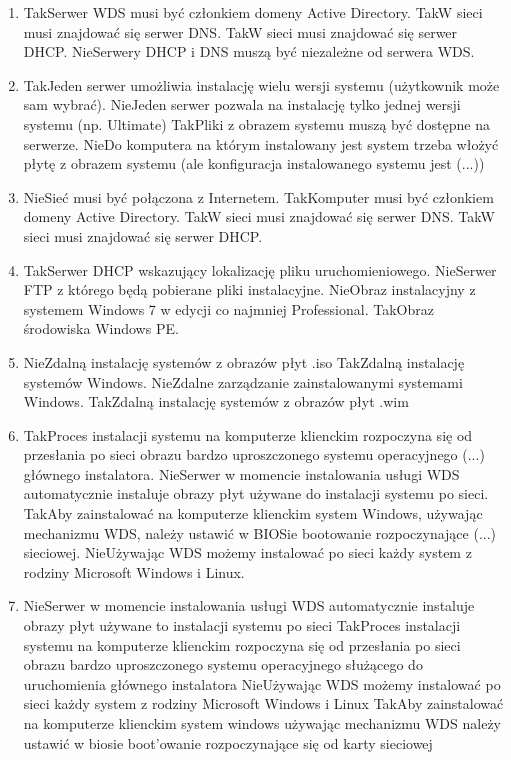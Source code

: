 \begin{enumerate}
		{Tak}{Kontroler domeny, serwer DNS, serwer DHCP}
		\item {}%
		{Tak}{Serwer WDS musi być członkiem domeny Active Directory.}%
		{Tak}{W sieci musi znajdować się serwer DNS.}%
		{Tak}{W sieci musi znajdować się serwer DHCP.}%
		{Nie}{Serwery DHCP i DNS muszą być niezależne od serwera WDS.}
		\item {}%
		{Tak}{Jeden serwer umożliwia instalację wielu wersji systemu (użytkownik może sam wybrać).}%
		{Nie}{Jeden serwer pozwala na instalację tylko jednej wersji systemu (np. Ultimate)}%
		{Tak}{Pliki z obrazem systemu muszą być dostępne na serwerze.}%
		{Nie}{Do komputera na którym instalowany jest system trzeba włożyć płytę z obrazem systemu (ale konfiguracja instalowanego systemu jest (...))}
		\item {}%
		{Nie}{Sieć musi być połączona z Internetem.}%
		{Tak}{Komputer musi być członkiem domeny Active Directory.}%
		{Tak}{W sieci musi znajdować się serwer DNS.}%
		{Tak}{W sieci musi znajdować się serwer DHCP.}
		\item {}%
		{Tak}{Serwer DHCP wskazujący lokalizację pliku uruchomieniowego.}%
		{Nie}{Serwer FTP z którego będą pobierane pliki instalacyjne.}%
		{Nie}{Obraz instalacyjny z systemem Windows 7 w edycji co najmniej Professional.}%
		{Tak}{Obraz środowiska Windows PE.}
		\item {}%
		{Nie}{Zdalną instalację systemów z obrazów płyt .iso}%
		{Tak}{Zdalną instalację systemów Windows.}%
		{Nie}{Zdalne zarządzanie zainstalowanymi systemami Windows.}%
		{Tak}{Zdalną instalację systemów z obrazów płyt .wim}
		\item {}%
		{Tak}{Proces instalacji systemu na komputerze klienckim rozpoczyna się od przesłania po sieci obrazu bardzo uproszczonego systemu operacyjnego (...) głównego instalatora.}%
		{Nie}{Serwer w momencie instalowania usługi WDS automatycznie instaluje obrazy płyt używane do instalacji systemu po sieci.}%
		{Tak}{Aby zainstalować na komputerze klienckim system Windows, używając mechanizmu WDS, należy ustawić w BIOSie bootowanie rozpoczynające (...) sieciowej.}%
		{Nie}{Używając WDS możemy instalować po sieci każdy system z rodziny Microsoft Windows i Linux.}
		\item {}%
		{Nie}{Serwer w momencie instalowania usługi WDS automatycznie instaluje obrazy płyt używane to instalacji systemu po sieci}%
		{Tak}{Proces instalacji systemu na komputerze klienckim rozpoczyna się od przesłania po sieci obrazu bardzo uproszczonego systemu operacyjnego służącego do uruchomienia głównego instalatora}%
		{Nie}{Używając WDS możemy instalować po sieci każdy system z rodziny Microsoft Windows i Linux}%
		{Tak}{Aby zainstalować na komputerze klienckim system windows używając mechanizmu WDS należy ustawić w biosie boot'owanie rozpoczynające się od karty sieciowej}
				

\end{enumerate}

